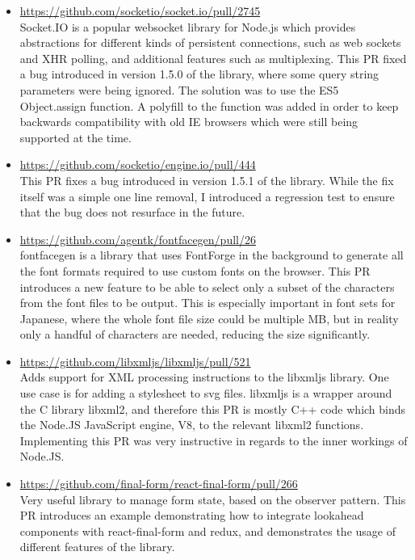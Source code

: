\documentclass{res}
\begin{document}
\begin{resume}
\begin{itemize}
  \item \url{https://github.com/socketio/socket.io/pull/2745} \\
  Socket.IO is a popular websocket library for Node.js which provides
  abstractions for different kinds of persistent connections, such as web
  sockets and XHR polling, and additional features such as multiplexing.
  This PR fixed a bug introduced in version 1.5.0 of the library, where
  some query string parameters were being ignored. The solution was to use
  the ES5 Object.assign function. A polyfill to the function was added in
  order to keep backwards compatibility with old IE browsers which were
  still being supported at the time.

  \item \url{https://github.com/socketio/engine.io/pull/444} \\
  This PR fixes a bug introduced in version 1.5.1 of the library.
  While the fix itself was a simple one line removal, I introduced a
  regression test to ensure that the bug does not resurface in the future.

  \item \url{https://github.com/agentk/fontfacegen/pull/26} \\
  fontfacegen is a library that uses FontForge in the background to generate
  all the font formats required to use custom fonts on the browser. This PR
  introduces a new feature to be able to select only a subset of the
  characters from the font files to be output. This is especially important
  in font sets for Japanese, where the whole font file size could be multiple
  MB, but in reality only a handful of characters are needed, reducing the
  size significantly.

  \item \url{https://github.com/libxmljs/libxmljs/pull/521} \\
  Adds support for XML processing instructions to the libxmljs library.
  One use case is for adding a stylesheet to svg files.
  libxmljs is a wrapper around the C library libxml2, and therefore this
  PR is mostly C++ code which binds the Node.JS JavaScript engine, V8, to
  the relevant libxml2 functions. Implementing this PR was very instructive
  in regards to the inner workings of Node.JS.

  \item \url{https://github.com/final-form/react-final-form/pull/266} \\
  Very useful library to manage form state, based on the observer pattern.
  This PR introduces an example demonstrating how to integrate lookahead components
  with react-final-form and redux, and demonstrates the usage of different
  features of the library.


\end{itemize}
\end{resume}
\end{document}
